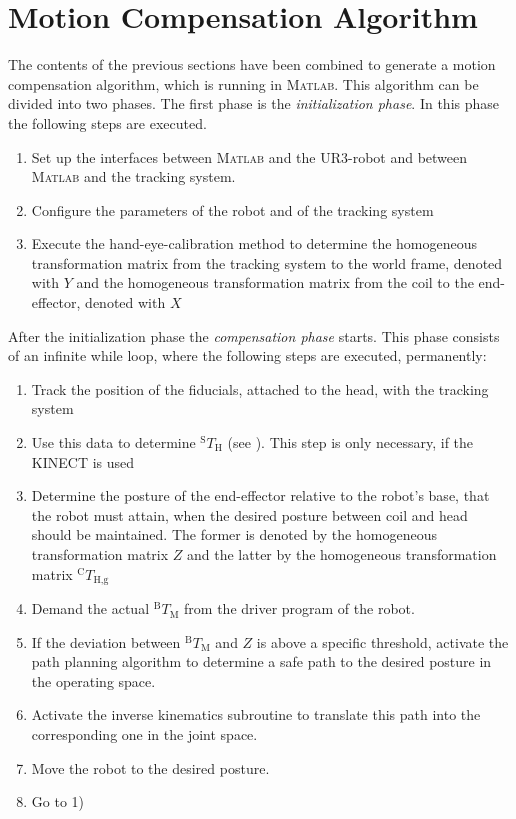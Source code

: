  \section{Motion Compensation Algorithm}
The contents of the previous sections have been combined to generate a motion compensation algorithm, which is running in \textsc{Matlab}. This algorithm can be divided into two phases. The first phase is the \textit{initialization phase}. In this phase the following steps are executed.
\begin{enumerate}
\item Set up the interfaces between \textsc{Matlab} and the UR3-robot and between \textsc{Matlab} and the tracking system.
\item Configure the parameters of the robot and of the tracking system
\item Execute the hand-eye-calibration method to determine the homogeneous transformation matrix from the tracking system to the world frame, denoted with $Y$ and the homogeneous transformation matrix from the coil to the end-effector, denoted with $X$
\end{enumerate}
After the initialization phase the \textit{compensation phase} starts. This phase consists of an infinite while loop, where the following steps are executed, permanently:
\begin{enumerate}
\item Track the position of the fiducials, attached to the head, with the tracking system
\item Use this data to determine $^{\text{S}}T_{\text{H}}$ (see ). This step is only necessary, if the KINECT is used
\item Determine the posture of the end-effector relative to the robot's base, that the robot must attain, when the desired posture between coil and head should be maintained. The former is denoted by the homogeneous transformation matrix $Z$ and the latter by the homogeneous transformation matrix $^{\text{C}}T_{\text{H,g}}$
\item Demand the actual $^{\text{B}}T_{\text{M}}$ from the driver program of the robot.
\item If the deviation between $^{\text{B}}T_{\text{M}}$ and $Z$ is above a specific threshold, activate the path planning algorithm to determine a safe path to the desired posture in the operating space.
\item Activate the inverse kinematics subroutine to translate this path into the corresponding one in the joint space.
\item Move the robot to the desired posture.
\item Go to 1)
\end{enumerate}
